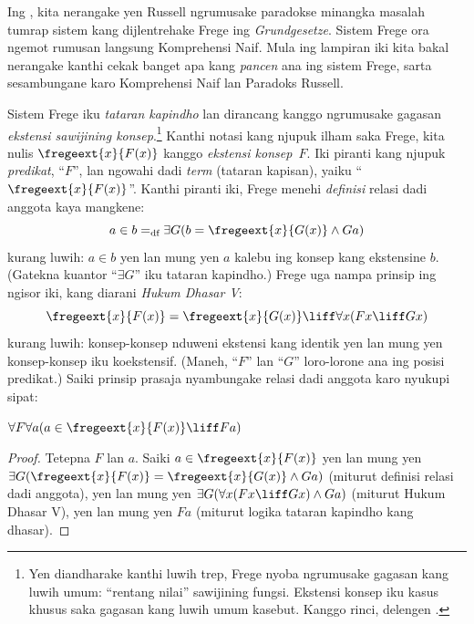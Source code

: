 \documentclass[../../../include/open-logic-section]{subfiles}
\begin{document}


Ing , kita nerangake yen Russell ngrumusake
paradokse minangka masalah tumrap sistem kang dijlentrehake
Frege ing \emph{Grundgesetze}. Sistem Frege ora ngemot rumusan
langsung Komprehensi Naif. Mula ing lampiran iki kita bakal
nerangake kanthi cekak banget apa kang \emph{pancen} ana
ing sistem Frege, sarta sesambungane karo Komprehensi Naif
lan Paradoks Russell.

Sistem Frege iku \emph{tataran kapindho} lan dirancang kanggo
ngrumusake gagasan \emph{ekstensi sawijining konsep}.\footnote{Yen
diandharake kanthi luwih trep, Frege nyoba ngrumusake gagasan
kang luwih umum: ``rentang nilai'' sawijining fungsi. Ekstensi
konsep iku kasus khusus saka gagasan kang luwih umum kasebut.
Kanggo rinci, delengen \citet[pp.\ 8--9]{Heck2012}.}
Kanthi notasi kang njupuk ilham saka Frege, kita nulis
$\fregeext{x}{F(x)}$ kanggo \emph{ekstensi konsep~$F$}.
Iki piranti kang njupuk \emph{predikat}, ``$F$'', lan
ngowahi dadi \emph{term} (tataran kapisan), yaiku
``$\fregeext{x}{F(x)}$''. Kanthi piranti iki, Frege menehi
\emph{definisi} relasi dadi anggota kaya mangkene:
\[
	a \in b =_\text{df} \exists G(b = \fregeext{x}{G(x)} \land Ga)
\]
kurang luwih: $a \in b$ yen lan mung yen $a$ kalebu ing konsep
kang ekstensine $b$. (Gatekna kuantor ``$\exists G$'' iku
tataran kapindho.) Frege uga nampa prinsip ing ngisor iki,
kang diarani \emph{Hukum Dhasar V}:
$$\fregeext{x}{F(x)} = \fregeext{x}{G(x)} \liff \forall x (Fx \liff Gx)$$
kurang luwih: konsep-konsep nduweni ekstensi kang identik yen
lan mung yen konsep-konsep iku koekstensif. (Maneh,
``$F$'' lan ``$G$'' loro-lorone ana ing posisi predikat.)
Saiki prinsip prasaja nyambungake relasi dadi anggota karo nyukupi sipat:

\begin{lem}
$\forall F \forall a(a \in \fregeext{x}{F(x)} \liff Fa)$
\end{lem}

\begin{proof} 
Tetepna $F$ lan $a$. Saiki $a \in \fregeext{x}{F(x)}$ yen lan
mung yen $\exists G(\fregeext{x}{F(x)}
= \fregeext{x}{G(x)} \land Ga)$ (miturut definisi relasi dadi anggota),
yen lan mung yen $\exists G(\forall x(Fx \liff Gx) \land Ga)$
(miturut Hukum Dhasar V), yen lan mung yen $Fa$ (miturut
logika tataran kapindho kang dhasar).
\end{proof}
\end{document}
